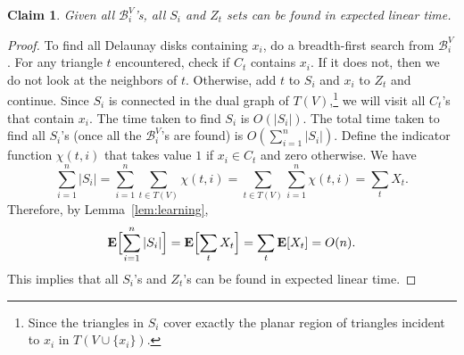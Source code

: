 \documentclass{siamltex}
\newcommand{\EX}{\hbox{\bf E}}
\newcommand{\tsearch}{\mathcal{B}}
\newtheorem{claim}[theorem]{Claim}
\begin{document}
\begin{claim} \label{clm:getting-si} 
Given all $\tsearch_i^V$'s, all $S_i$ and $Z_t$ sets 
can be found in expected linear time.
\end{claim}

\begin{proof} 
To find all Delaunay disks containing $x_i$, do a breadth-first search
from $\tsearch_i^V$. For any triangle $t$ encountered, check
if $C_t$ contains $x_i$. If it does not, then
we do not look at the neighbors of $t$. Otherwise, add 
$t$ to $S_i$ and $x_i$ to $Z_t$ and continue.
Since $S_i$ is connected in the dual graph of 
$T(V)$,\footnote{Since the triangles in $S_i$ cover exactly
the planar region of triangles incident to $x_i$ in
$T(V \cup \{x_i\})$.} we will visit
all $C_t$'s that contain $x_i$.
The time taken
to find $S_i$ is $O(|S_i|)$.
The total time taken
to find all $S_i$'s (once all the $\tsearch_i^V$'s are found)
is $O(\sum_{i=1}^n |S_i|)$. Define the indicator function $\chi(t,i)$ that
takes value $1$ if $x_i \in C_t$ and zero otherwise.  We have
\[
\sum_{i=1}^n |S_i| = \sum_{i=1}^n \sum_{t\in T(V)} \chi(t,i) = \sum_{t\in T(V)} \sum_{i=1}^n \chi(t,i) = \sum_t X_t.
\]
Therefore, by Lemma~\ref{lem:learning},
\[ 
\EX\Bigl[\sum_{i=1}^n |S_i|\Bigr] = 
\EX\Bigl[\sum_t X_t\Bigr] = \sum_t \EX[X_t] 
= O(n).
\]
This implies that all $S_i$'s and $Z_t$'s can
be found in expected linear time.
\end{proof}
\medskip
\end{document}
